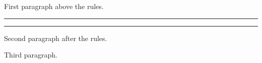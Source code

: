 %
%
\vsize=180pt
\hsize=4in
\noindent First paragraph above the rules.
\par
\hrule
\hrule
\noindent Second paragraph after the rules.
\par
\noindent Third paragraph.
\par
\eject
\bye
